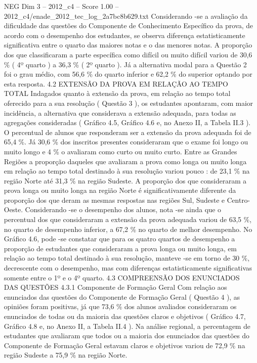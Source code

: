 \begin{textsample}{NEG Dim 3 – 2012\_c4 – Score 1.00 – 2012\_c4/enade\_2012\_tec\_log\_2a7bc8b629.txt}
Considerando -se a avaliação da dificuldade das questões do Componente de Conhecimento Específico da prova, de acordo com o desempenho dos estudantes, se observa diferença estatisticamente significativa entre o quarto das maiores notas e o das menores notas.
A proporção dos que classificaram a parte específica como difícil ou muito difícil variou de 30,6 \% ( 4º quarto ) a 36,3 \% ( 2º quarto ).
Já a alternativa modal para a Questão 2 foi o grau médio, com 56,6 \% do quarto inferior e 62,2 \% do superior optando por esta resposta. 4.2 EXTENSÃO DA PROVA EM RELAÇÃO AO TEMPO TOTAL Indagados quanto à extensão da prova, em relação ao tempo total oferecido para a sua resolução ( Questão 3 ), os estudantes apontaram, com maior incidência, a alternativa que considerava a extensão adequada, para todas as agregações consideradas ( Gráfico 4.5, Gráfico 4.6 e, no Anexo II, a Tabela II.3 ).
O percentual de alunos que responderam ser a extensão da prova adequada foi de 65,4 \%.
Já 30,6 \% dos inscritos presentes consideraram que o exame foi longo ou muito longo e 4 \% o avaliaram como curto ou muito curto.
Entre as Grandes Regiões a proporção daqueles que avaliaram a prova como longa ou muito longa em relação ao tempo total destinado à sua resolução variou pouco : de 23,1 \% na região Norte até 31,3 \% na região Sudeste.
A proporção dos que consideraram a prova longa ou muito longa na região Norte é significativamente diferente da proporção dos que deram as mesmas respostas nas regiões Sul, Sudeste e Centro-Oeste.
Considerando -se o desempenho dos alunos, nota -se ainda que o percentual dos que consideraram a extensão da prova adequada variou de 63,5 \%, no quarto de desempenho inferior, a 67,2 \% no quarto de melhor desempenho.
No Gráfico 4.6, pode -se constatar que para os quatro quartos de desempenho a proporção de estudantes que consideraram a prova longa ou muito longa, em relação ao tempo total destinado à sua resolução, manteve -se em torno de 30 \%, decrescente com o desempenho, mas com diferenças estatisticamente significativas somente entre o 1º e o 4º quarto. 4.3 COMPREENSÃO DOS ENUNCIADOS DAS QUESTÕES 4.3.1 Componente de Formação Geral Com relação aos enunciados das questões do Componente de Formação Geral ( Questão 4 ), as opiniões foram positivas, já que 73,6 \% dos alunos avaliados consideraram os enunciados de todas ou da maioria das questões claros e objetivos ( Gráfico 4.7, Gráfico 4.8 e, no Anexo II, a Tabela II.4 ).
Na análise regional, a percentagem de estudantes que avaliaram que todos ou a maioria dos enunciados das questões do Componente de Formação Geral estavam claros e objetivos variou de 72,9 \% na região Sudeste a 75,9 \% na região Norte.

\end{textsample}
